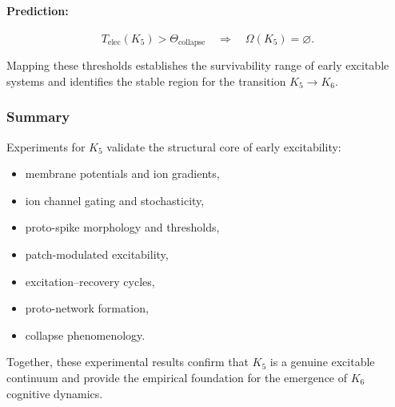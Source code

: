 \paragraph{Prediction:}

\[
   T_{\mathrm{elec}}(K_5) > \Theta_{\mathrm{collapse}} 
   \quad \Rightarrow \quad 
   \Omega(K_5) = \varnothing.
\]

Mapping these thresholds establishes the survivability range 
of early excitable systems and identifies the stable region 
for the transition $K_5 \rightarrow K_6$.



\subsubsection{Summary}

Experiments for $K_5$ validate the structural core of early excitability:

\begin{itemize}
    \item membrane potentials and ion gradients,
    \item ion channel gating and stochasticity,
    \item proto-spike morphology and thresholds,
    \item patch-modulated excitability,
    \item excitation--recovery cycles,
    \item proto-network formation,
    \item collapse phenomenology.
\end{itemize}

Together, these experimental results confirm that $K_5$ is a 
genuine excitable continuum and provide the empirical foundation 
for the emergence of $K_6$ cognitive dynamics.
